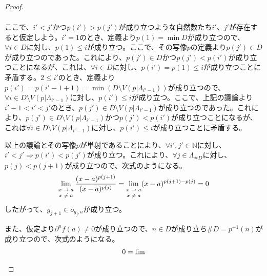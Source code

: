 \documentclass[dvipdfmx]{jsarticle}
\begin{document}
\begin{proof}
\begin{align*}
\end{align*}\par
ここで、$i' < j'$かつ$p\left( i' \right) > p\left( j' \right)$が成り立つような自然数たち$i'$、$j'$が存在すると仮定しよう。$i' = 1$のとき、定義より$p(1) = \min D$が成り立つので、$\forall i \in D$に対し、$p(1) \leq i$が成り立つ。ここで、その写像$p$の定義より$p\left( j' \right) \in D$が成り立つのであった。これにより、$p\left( j' \right) \in D$かつ$p\left( j' \right) < p\left( i' \right)$が成り立つことになるが、これは、$\forall i \in D$に対し、$p\left( i' \right) = p(1) \leq i$が成り立つことに矛盾する。$2 \leq i'$のとき、定義より$p\left( i' \right) = p\left( i' - 1 + 1 \right) = \min\left( D \setminus V\left( p|\varLambda_{i' - 1} \right) \right)$が成り立つので、$\forall i \in D \setminus V\left( p|\varLambda_{i' - 1} \right)$に対し、$p\left( i' \right) \leq i$が成り立つ。ここで、上記の議論より$i' - 1 < i' < j'$のとき、$p\left( j' \right) \in D \setminus V\left( p|\varLambda_{i' - 1} \right)$が成り立つのであった。これにより、$p\left( j' \right) \in D \setminus V\left( p|\varLambda_{i' - 1} \right)$かつ$p\left( j' \right) < p\left( i' \right)$が成り立つことになるが、これは$\forall i \in D \setminus V\left( p|\varLambda_{i' - 1} \right)$に対し、$p\left( i' \right) \leq i$が成り立つことに矛盾する。\par
以上の議論とその写像$p$が単射であることにより、$\forall i',j' \in \mathbb{N}$に対し、$i' < j' \Rightarrow p\left( i' \right) < p\left( j' \right)$が成り立つ。これにより、$\forall j \in \varLambda_{\#D}$に対し、$p(j) < p(j + 1)$が成り立つので、次式のようになる。
\begin{align*}
\lim_{\scriptsize \begin{matrix}
x \rightarrow a \\
x \neq a \\
\end{matrix}}\frac{(x - a)^{p(j + 1)}}{(x - a)^{p(j)}} = \lim_{\scriptsize \begin{matrix}
x \rightarrow a \\
x \neq a \\
\end{matrix}}(x - a)^{p(j + 1) - p(j)} = 0
\end{align*}
したがって、$g_{j + 1} \in o_{g_{j},a}$が成り立つ。\par
また、仮定より$\partial^{n}f(a) \neq 0$が成り立つので、$n \in D$が成り立ち$\#D = p^{- 1}(n)$が成り立つので、次式のようになる。
\begin{align*}
0 = \lim_{\scriptsize \begin{matrix}

\end{matrix}}
\end{align*}
\end{proof}
\end{document}
